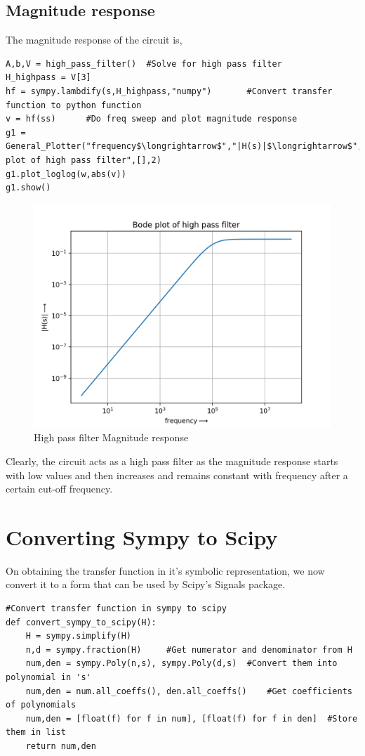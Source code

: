\documentclass[11pt, a4paper]{article}
\begin{document}
\subsection{Magnitude response}
The magnitude response of the circuit is,
\begin{lstlisting}
A,b,V = high_pass_filter()	#Solve for high pass filter
H_highpass = V[3]
hf = sympy.lambdify(s,H_highpass,"numpy")		#Convert transfer function to python function
v = hf(ss)		#Do freq sweep and plot magnitude response
g1 = General_Plotter("frequency$\longrightarrow$","|H(s)|$\longrightarrow$","Bode plot of high pass filter",[],2)
g1.plot_loglog(w,abs(v))
g1.show()
\end{lstlisting}
\begin{figure}[!tbh]
   	\centering
   	\includegraphics[scale=0.5]{high_pass_bode.png}   
   	\caption{High pass filter Magnitude response}
   	\label{fig:Figure_1}
\end{figure}
Clearly, the circuit acts as a high pass filter as the magnitude response starts with low values and then increases and remains constant with frequency after a certain cut-off frequency.

\section{Converting Sympy to Scipy}
On obtaining the transfer function in it's symbolic representation, we now convert it to a form that can be used by Scipy's Signals package.
\begin{lstlisting}
#Convert transfer function in sympy to scipy
def convert_sympy_to_scipy(H):
	H = sympy.simplify(H)
	n,d = sympy.fraction(H)		#Get numerator and denominator from H
	num,den = sympy.Poly(n,s), sympy.Poly(d,s)	#Convert them into polynomial in 's'
	num,den = num.all_coeffs(), den.all_coeffs()	#Get coefficients of polynomials
	num,den = [float(f) for f in num], [float(f) for f in den]	#Store them in list
	return num,den
\end{lstlisting}
\end{document}
